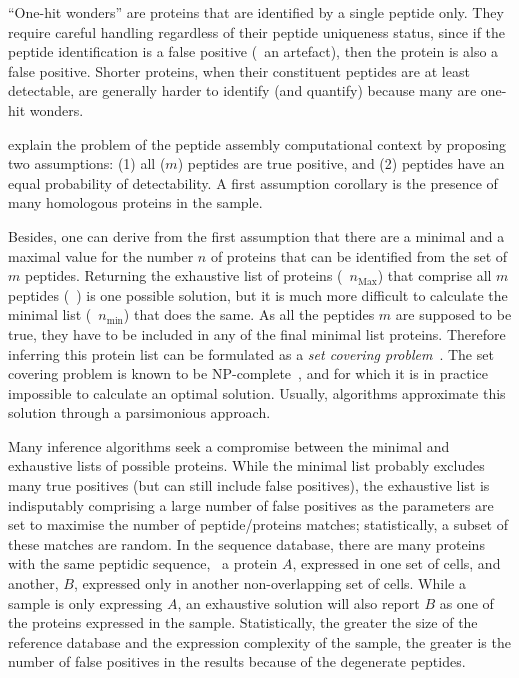 \enquote{One-hit wonders} are proteins
that are identified by a single peptide only.
They require careful handling regardless of their peptide uniqueness status,
since if the peptide identification is a false positive (\ie\ an artefact),
then the protein is also a false positive.
Shorter proteins,
when their constituent peptides are at least detectable,
are generally harder to identify (and quantify)
because many are one-hit wonders.

\citet{Huang2012-nr} explain the problem of
the peptide assembly computational context by proposing two assumptions:
(1) all ($m$) peptides are true positive,
and (2) peptides have an equal probability of detectability.
A first assumption corollary is the presence of many homologous proteins in the sample.

Besides, one can derive from the first assumption
that there are a minimal and a maximal value
for the number $n$ of proteins that can be identified
from the set of $m$ peptides.
Returning the exhaustive list of proteins (\ie\ $n_\text{Max}$)
that comprise all $m$ peptides (\eg\ \citet{Tabb2002-wm}) is one possible solution,
but it is much more difficult to calculate the minimal list
(\ie\ $n_\text{min}$) that does the same.
As all the peptides $m$ are supposed to be true,
they have to be included in any of the final minimal list proteins.
Therefore inferring this protein list can be formulated
as a \emph{set covering problem}~.
The set covering problem is known to be \gls{NP}-complete~,
and for which it is in practice impossible to calculate an optimal solution.
Usually, algorithms approximate this solution through a parsimonious approach.

Many inference algorithms seek
a compromise between the minimal and exhaustive lists of possible proteins.
While the minimal list probably excludes many true positives
(but can still include false positives),
the exhaustive list is indisputably comprising a large number of false positives
as the parameters are set to maximise the number of peptide/proteins matches;
statistically, a subset of these matches are random.
In the sequence database,
there are many proteins with the same peptidic sequence,
\eg\ a protein $A$, expressed in one set of cells, and
another, $B$, expressed only in another non-overlapping set of cells.
While a sample is only expressing $A$,
an exhaustive solution will also report
$B$ as one of the proteins expressed in the sample.
Statistically,
the greater the size of the reference database
and the expression complexity of the sample,
the greater is the number of false positives in the results
because of the degenerate peptides.

